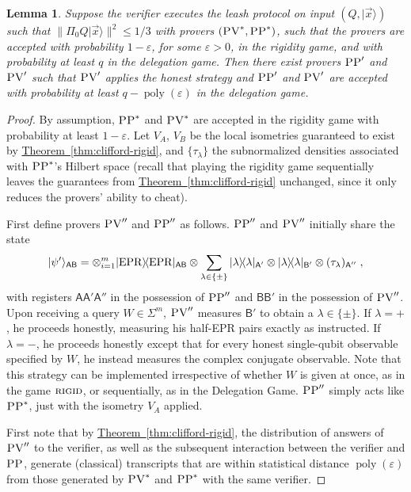 \documentclass[11pt]{article}
\numberwithin{equation}{section}
\newtheorem{lemma}[theorem]{Lemma}
\theoremstyle{definition}
\theoremstyle{plain}
\newcommand{\expref}[2]{\hyperref[#2]{#1~\ref{#2}}}
\newcommand{\ket}[1]{|#1\rangle}
\newcommand{\bra}[1]{\langle#1|}
\newcommand{\proj}[1]{\ket{#1}\!\bra{#1}}
\DeclareMathOperator{\poly}{poly}
\newcommand{\reg}[1]{{\textsf{#1}}}
\newcommand{\eps}{\varepsilon}
\newcommand{\EPR}{{\rm EPR}}
\newcommand{\rigid}{\textsc{rigid}}
\newcommand{\pv}{\textsc{PV}}
\newcommand{\pp}{\textsc{PP}}
\begin{document}
\begin{lemma}\label{soundlemma}
Suppose the verifier executes the leash protocol  on input $(Q,\ket{\vec{x}})$ such that $\|\Pi_0 Q\ket{\vec{x}}\|^2 \leq 1/3$ with provers $(\pv^*,\pp^*)$, such that the provers are accepted with probability $1-\eps$, for some $\eps>0$, in the rigidity game, and with probability at least $q$ in the delegation game. Then there exist provers $\pp'$ and $\pv'$ such that $\pv'$ applies the honest strategy and $\pp'$ and $\pv'$ are accepted with probability at least $q-\poly(\eps)$ in the delegation game.
\end{lemma}

\begin{proof}
By assumption, $\pp^*$ and $\pv^*$ are accepted in the rigidity game with
  probability at least $1-\eps$. Let $V_A$, $V_B$ be the local isometries
  guaranteed to exist by \expref{Theorem}{thm:clifford-rigid}, and
  $\{\tau_\lambda\}$ the subnormalized densities associated with $\pp^*$'s
  Hilbert space (recall that playing the rigidity game sequentially leaves the
  guarantees from \expref{Theorem}{thm:clifford-rigid} unchanged, since it only reduces the provers' ability to cheat).

First define provers $\pv''$ and $\pp''$ as follows. $\pp''$ and $\pv''$ initially share the state 
$$\ket{\psi'}_{\reg{AB}} = \otimes_{i=1}^{m} \proj{\EPR}_{\reg{AB}} \otimes \sum_{\lambda\in\{\pm\}}  \proj{\lambda}_{\reg{A}'}\otimes \proj{\lambda}_{\reg{B}'}\otimes (\tau_\lambda)_{\reg{A}''}\;,$$
with registers $\reg{A}\reg{A}'\reg{A}''$ in the possession of $\pp''$ and $\reg{BB}'$ in the possession of $\pv''$. 
Upon receiving a query $W\in \Sigma^m$, $\pv''$ measures $\reg{B}'$ to obtain a $\lambda\in\{\pm\}$. If $\lambda=+$, he proceeds honestly, measuring his half-EPR pairs exactly as instructed. If $\lambda=-$, he proceeds honestly except that for every honest single-qubit observable specified by $W$, he instead measures the complex conjugate observable. Note that this strategy can be implemented irrespective of whether $W$ is given at once, as in the game $\rigid$, or sequentially, as in the Delegation Game. $\pp''$ simply acts like $\pp^*$, just with the isometry $V_A$ applied. 

First note that by \expref{Theorem}{thm:clifford-rigid}, the distribution of answers of $\pv''$ to the verifier, as well as the subsequent interaction between the verifier and $\pp$, generate (classical) transcripts that are within statistical distance $\poly(\eps)$ from those generated by $\pv^*$ and $\pp^*$ with the same verifier. 


\end{proof}
\end{document}
